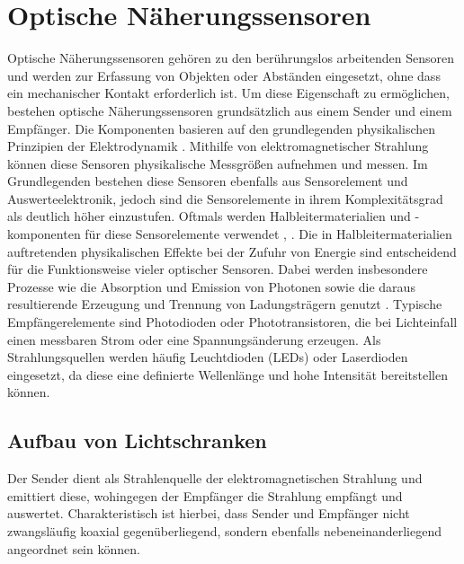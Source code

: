 \section{Optische Näherungssensoren}
\label{sec:OptischeSensoren}
Optische Näherungssensoren gehören zu den berührungslos arbeitenden Sensoren und werden zur Erfassung von Objekten oder Abständen eingesetzt, ohne dass ein mechanischer Kontakt erforderlich ist. Um diese Eigenschaft zu ermöglichen, bestehen optische Näherungssensoren grundsätzlich aus einem Sender und einem Empfänger.
Die Komponenten basieren auf den grundlegenden physikalischen Prinzipien der Elektrodynamik \cite{Roddeck:2023}. Mithilfe von elektromagnetischer Strahlung können diese Sensoren physikalische Messgrößen aufnehmen und messen. Im Grundlegenden bestehen diese Sensoren ebenfalls aus Sensorelement und Auswerteelektronik, jedoch sind die Sensorelemente in ihrem Komplexitätsgrad als deutlich höher einzustufen. Oftmals werden Halbleitermaterialien und -komponenten für diese Sensorelemente verwendet \cite{Roddeck:2023}, \cite{Loeffler-Mang:2012}. Die in Halbleitermaterialien auftretenden physikalischen Effekte bei der Zufuhr von Energie sind entscheidend für die Funktionsweise vieler optischer Sensoren. Dabei werden insbesondere Prozesse wie die Absorption und Emission von Photonen sowie die daraus resultierende Erzeugung und Trennung von Ladungsträgern genutzt \cite{Feynman:2020}. 
Typische Empfängerelemente sind Photodioden oder Phototransistoren, die bei Lichteinfall einen messbaren Strom oder eine Spannungsänderung erzeugen. Als Strahlungsquellen werden häufig Leuchtdioden (LEDs) oder Laserdioden eingesetzt, da diese eine definierte Wellenlänge und hohe Intensität bereitstellen können. \cite{Loeffler-Mang:2012}

\subsection{Aufbau von Lichtschranken}

Der Sender dient als Strahlenquelle der elektromagnetischen Strahlung und emittiert diese, wohingegen der Empfänger die Strahlung empfängt und auswertet. Charakteristisch ist hierbei, dass Sender und Empfänger nicht zwangsläufig koaxial gegenüberliegend, sondern ebenfalls nebeneinanderliegend angeordnet sein können. 

